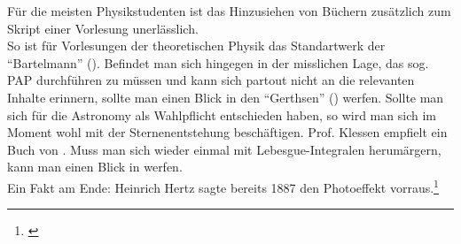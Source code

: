 \documentclass{scrartcl}
\begin{document}
Für die meisten Physikstudenten ist das Hinzusiehen von Büchern zusätzlich zum Skript einer Vorlesung unerlässlich. \\
So ist für Vorlesungen der theoretischen Physik das Standartwerk der ``Bartelmann'' (\cite{Bartelmann}).
Befindet man sich hingegen in der misslichen Lage, das sog. PAP durchführen zu müssen und kann sich partout nicht an die relevanten Inhalte erinnern, sollte man einen Blick in den ``Gerthsen'' (\cite{Gerthsen}) werfen.
Sollte man sich für die Astronomy als Wahlpflicht entschieden haben, so wird man sich im Moment wohl mit der Sternenentstehung beschäftigen. Prof. Klessen empfielt ein Buch von \cite{astro}.
Muss man sich wieder einmal mit Lebesgue-Integralen herumärgern, kann man einen Blick in \cite[][Kap. X]{aescher} werfen.\\
Ein Fakt am Ende: Heinrich Hertz sagte bereits 1887 den Photoeffekt vorraus.\footnote{\cite[vgl.][S. 998f.]{Hertz1887}}

\newpage

\printbibliography[title=Bücher, type=book]
\printbibliography[title=Artikel, type=article]
\end{document}
